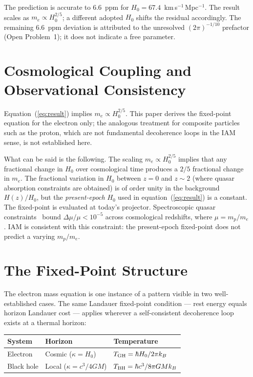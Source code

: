 \documentclass[12pt,a4paper]{article}
\begin{document}
The prediction is accurate to 6.6~ppm for $H_0 = 67.4$~km\,s$^{-1}$\,Mpc$^{-1}$.
The result scales as $m_e \propto H_0^{2/5}$; a different adopted $H_0$ shifts
the residual accordingly. The remaining 6.6~ppm deviation is attributed to the
unresolved $(2\pi)^{-1/10}$ prefactor (Open Problem~1); it does not indicate a
free parameter.

\section{Cosmological Coupling and Observational Consistency}

Equation~(\ref{eq:result}) implies $m_e \propto H_0^{2/5}$. This paper derives
the fixed-point equation for the electron only; the analogous treatment for
composite particles such as the proton, which are not fundamental decoherence
loops in the IAM sense, is not established here.

What can be said is the following. The scaling $m_e \propto H_0^{2/5}$ implies
that any fractional change in $H_0$ over cosmological time produces a $2/5$
fractional change in $m_e$. The fractional variation in $H_0$ between $z = 0$
and $z \sim 2$ (where quasar absorption constraints are obtained) is of order
unity in the background $H(z)/H_0$, but the \emph{present-epoch} $H_0$ used in
equation~(\ref{eq:result}) is a constant. The fixed-point is evaluated at
today's projector. Spectroscopic quasar constraints~\cite{ubachs2016} bound
$\Delta\mu/\mu < 10^{-5}$ across cosmological redshifts, where $\mu =
m_p/m_e$. IAM is consistent with this constraint: the present-epoch fixed-point
does not predict a varying $m_p/m_e$.

\section{The Fixed-Point Structure}

The electron mass equation is one instance of a pattern visible in two
well-established cases. The same Landauer fixed-point condition --- rest energy
equals horizon Landauer cost --- applies wherever a self-consistent decoherence
loop exists at a thermal horizon:

\begin{center}
\begin{tabular}{lll}
\toprule
System & Horizon & Temperature \\
\midrule
Electron & Cosmic ($\kappa = H_0$) & $T_{\rm GH} = \hbar H_0/2\pi k_B$ \\
Black hole & Local ($\kappa = c^3/4GM$) & $T_{\rm BH} = \hbar c^3/8\pi GMk_B$ \\
\bottomrule
\end{tabular}
\end{center}
\end{document}

